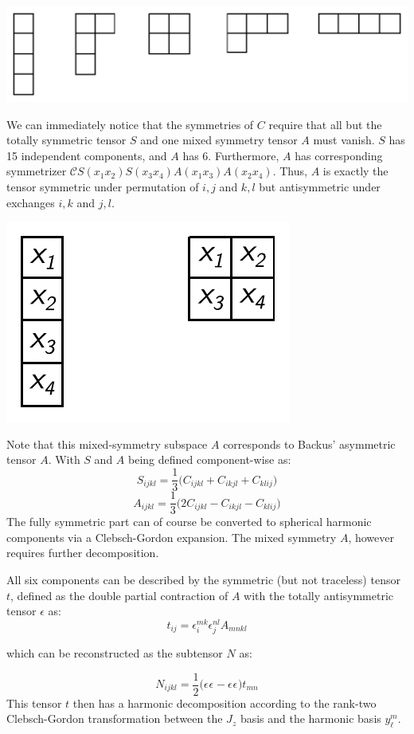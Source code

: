\documentclass[10pt,a4paper]{article}
\begin{document}
\begin{center}
\includegraphics[scale=0.7]{rank4_young.pdf}
\end{center}
We can immediately notice that the symmetries of $C$ require that all but the totally symmetric tensor $S$ and one mixed symmetry tensor $A$ must vanish. $S$ has 15 independent components, and $A$ has 6. Furthermore, $A$ has corresponding symmetrizer $\mathcal{C}S(x_1x_2)S(x_3x_4)A(x_1x_3)A(x_2x_4)$. Thus, $A$ is exactly the tensor symmetric under permutation of $i,j$ and $k,l$ but antisymmetric under exchanges $i,k$ and $j,l$.
\begin{center}
\includegraphics[scale=0.7]{elastic_young.pdf}
\end{center}
Note that this mixed-symmetry subspace $A$ corresponds to Backus' \cite{backus1970geometrical} asymmetric tensor $A$. With $S$ and $A$ being defined component-wise as:
$$
S_{ijkl}=\frac{1}{3}\big( C_{ijkl} + C_{ikjl} + C_{klij} \big)
$$
$$
A_{ijkl} = \frac{1}{3}\big( 2C_{ijkl} -C_{ikjl} -C_{klij}  \big)
$$
The fully symmetric part can of course be converted to spherical harmonic components via a Clebsch-Gordon expansion. The mixed symmetry $A$, however requires further decomposition. 

All six components can be described by the symmetric (but not traceless) tensor $t$, defined as the double partial contraction of $A$ with the totally antisymmetric tensor $\epsilon$ as:
$$
t_{ij} = \epsilon_{i}^{mk}\epsilon_{j}^{nl}A_{mnkl}
$$
\begin{center}
which can be reconstructed as the subtensor $N$ as:
\end{center}
$$
N_{ijkl}= \frac{1}{2}\big(\epsilon^{}\epsilon^{} - \epsilon^{} \epsilon^{} \big)t_{mn}
$$
This tensor $t$ then has a harmonic decomposition according to the rank-two Clebsch-Gordon transformation between the $J_z$ basis and the harmonic basis $y_{\ell}^m$. 
\end{document}
